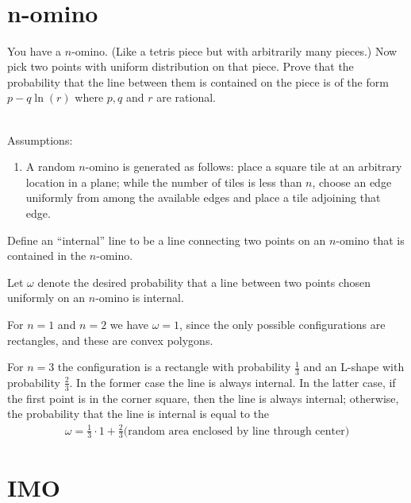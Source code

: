 \documentclass[12pt]{article}
\begin{document}
\begin{align*}

\end{align*}

\section{n-omino}
\begin{mdframed}
  You have a $n$-omino. (Like a tetris piece but with arbitrarily many pieces.)
  Now pick two points with uniform distribution on that piece. Prove that the
  probability that the line between them is contained on the piece is of the
  form $p - q\ln(r)$ where $p,q$ and $r$ are rational.
\end{mdframed}
~\\

Assumptions:
\begin{enumerate}
\item A random $n$-omino is generated as follows: place a square tile at an
  arbitrary location in a plane; while the number of tiles is less than $n$,
  choose an edge uniformly from among the available edges and place a tile
  adjoining that edge.
\end{enumerate}

Define an ``internal'' line to be a line connecting two points on an $n$-omino
that is contained in the $n$-omino.

Let $\omega$ denote the desired probability that a line between two points
chosen uniformly on an $n$-omino is internal.

For $n=1$ and $n=2$ we have $\omega = 1$, since the only possible
configurations are rectangles, and these are convex polygons.

For $n=3$ the configuration is a rectangle with probability $\frac{1}{3}$ and
an L-shape with probability $\frac{2}{3}$. In the former case the line is
always internal. In the latter case, if the first point is in the corner
square, then the line is always internal; otherwise, the probability that the
line is internal is equal to the
\begin{align*}
  \omega = \frac{1}{3}\cdot 1 + \frac{2}{3} \Big(\text{random area enclosed by line through center}\Big)
\end{align*}

\section{IMO}
\end{document}
